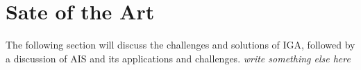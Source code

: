 


\section{Sate of the Art}
\label{sec:no2}
The following section will discuss the challenges and solutions of IGA, followed by a discussion of AIS and its applications and challenges.
\textit{write something else here}
